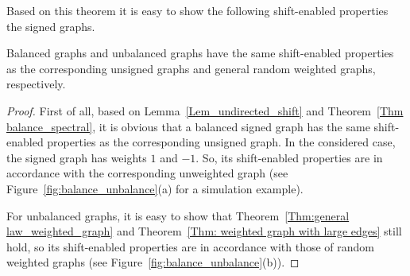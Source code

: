 \documentclass[journal]{IEEEtran}
\begin{document}
Based on this theorem it is easy to show the following shift-enabled properties the signed graphs.

\begin{Thm}
  Balanced graphs and unbalanced graphs 
  have the same shift-enabled properties as the corresponding unsigned graphs and general random weighted graphs, respectively.
\end{Thm}
\begin{proof}
First of all, based on Lemma~\ref{Lem_undirected_shift} and  Theorem~\ref{Thm balance_spectral}, it is obvious that a balanced signed graph has the same shift-enabled properties as the corresponding unsigned graph. In the considered case, the signed graph has weights $1$ and $-1$. So, its shift-enabled properties are in accordance with the corresponding unweighted graph (see Figure~\ref{fig:balance_unbalance}(a) for a simulation example).

For unbalanced graphs, it is easy to show that Theorem~\ref{Thm:general law_weighted_graph} and Theorem~\ref{Thm: weighted graph with large edges} still hold, so its shift-enabled properties are in accordance with those of random weighted graphs (see Figure~\ref{fig:balance_unbalance}(b)).
\end{proof}
\end{document}
